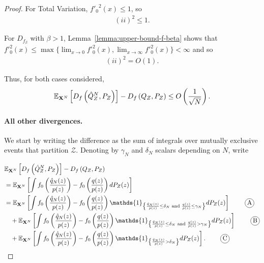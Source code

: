 \begin{proof}
For Total Variation, ${f'_0}^2(x) \leq 1$, so
\begin{align*}
    (ii)^2 \leq 1.
\end{align*}

For $D_{f_\beta}$ with $\beta>1$, Lemma~\ref{lemma:upper-bound-f-beta} shows that $f'^2_0(x) \leq \max\{\lim_{x\to 0}f'^2_0(x), \lim_{x\to \infty}f'^2_0(x)\} < \infty$ and so 
\begin{align*}
    (ii)^2 = O(1).
\end{align*}

Thus, for both cases considered,
\begin{align*}
    \mathbb{E}_{\mathbf{X}^N} \left[ D_f\left( \hat{Q}_Z^N , P_Z\right)\right] - D_f\left( Q_{Z} , P_Z\right) \leq O\left( \frac{1}{\sqrt{N}} \right).
\end{align*}

\paragraph{All other divergences.}

We start by writing the difference as the sum of integrals over mutually exclusive events that partition $\mathcal{Z}$.
Denoting by $\gamma_N$ and $\delta_N$ scalars depending on $N$, write

\begin{align*}
    & \E_{\XN} \left[ D_f\left( \hat{Q}_Z^N , P_Z\right)\right] - D_f\left( Q_{Z} , P_Z\right)  \\
    &= \E_{\XN} \left[\int f_0\left( \frac{\hat{q}_N(z)}{p(z)} \right) - f_0\left( \frac{q(z)}{p(z)} \right) dP_Z(z) \right] \\
    &= \E_{\XN} \left[ \int f_0\left( \frac{\hat{q}_N(z)}{p(z)} \right) - f_0\left( \frac{q(z)}{p(z)} \right) \mathds{1}_{\left\lbrace \frac{\hat{q}_N(z)}{p(z)} \leq \delta_N \text{ and } \frac{q(z)}{p(z)} \leq \gamma_N \right\rbrace} dP_Z(z) \right] \tag*{\encircle{A}}\\
    & \quad + \E_{\XN} \left[\int f_0\left( \frac{\hat{q}_N(z)}{p(z)} \right) - f_0\left( \frac{q(z)}{p(z)} \right) \mathds{1}_{\left\lbrace \frac{\hat{q}_N(z)}{p(z)} \leq \delta_N \text{ and } \frac{q(z)}{p(z)} > \gamma_N \right\rbrace} dP_Z(z) \right]\tag*{\encircle{B}}\\
    & \quad + \E_{\XN} \left[ \int f_0\left( \frac{\hat{q}_N(z)}{p(z)} \right) - f_0\left( \frac{q(z)}{p(z)} \right) \mathds{1}_{\left\lbrace \frac{\hat{q}_N(z)}{p(z)} > \delta_N \right\rbrace} dP_Z(z) \right]. \tag*{\encircle{C}}
\end{align*}


\end{proof}
